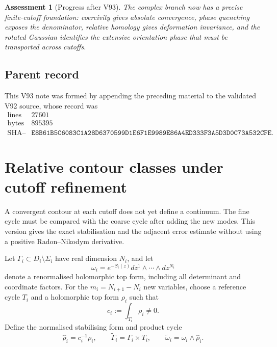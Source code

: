 \documentclass[11pt]{article}
\newtheorem{assessment}[theorem]{Assessment}
\begin{document}
\begin{assessment}[Progress after V93]
\label{ass:v11v93-status}
The complex branch now has a precise finite-cutoff foundation:
coercivity gives absolute convergence, phase quenching exposes the
denominator, relative homology gives deformation invariance, and the
rotated Gaussian identifies the extensive orientation phase that must
be transported across cutoffs.
\end{assessment}

\subsection{Parent record}

This V93 note was formed by appending the preceding material to the
validated V92 source, whose record was
\[
\begin{array}{c|c}
\text{lines}&27601\\
\text{bytes}&895395\\
\text{SHA--256}&
\texttt{E8B61B5C6083C1A28D6370599D1E6F1E9989E86A4ED333F3A5D3D0C73A532CFE}.
\end{array}                                                     \tag{93.21}
\]


\section{Relative contour classes under cutoff refinement}
\label{sec:v11v94}

A convergent contour at each cutoff does not yet define a continuum.
The fine cycle must be compared with the coarse cycle after adding the
new modes.  This version gives the exact stabilisation and the
adjacent error estimate without using a positive
Radon--Nikodym derivative.

Let \(\Gamma_i\subset D_i\setminus\Sigma_i\) have real dimension
\(N_i\), and let
\[
                   \omega_i=e^{-S_i(z)}
                      dz^1\wedge\cdots\wedge dz^{N_i}        \tag{94.1}
\]
denote a renormalised holomorphic top form, including all determinant
and coordinate factors.  For the \(m_i=N_{i+1}-N_i\) new variables,
choose a reference cycle \(T_i\) and a holomorphic top form \(\rho_i\)
such that
\[
                              c_i:=\int_{T_i}\rho_i\ne0.      \tag{94.2}
\]
Define the normalised stabilising form and product cycle
\[
 \widehat\rho_i=c_i^{-1}\rho_i,\qquad
 \widetilde\Gamma_i=\Gamma_i\times T_i,\qquad
 \widetilde\omega_i=\omega_i\wedge\widehat\rho_i.            \tag{94.3}
\]
\end{document}
